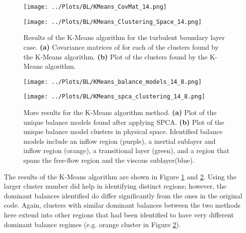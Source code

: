 \documentclass[12pt]{report} %
\begin{document}
\begin{figure}[htbp]
  \centering
  \begin{minipage}{0.9\textwidth}
    \centering
    \texttt{[image: ../Plots/BL/KMeans\_CovMat\_14.png]}
    \subcaption{}
  \end{minipage}

  \begin{minipage}{0.8\textwidth}
    \centering
    \texttt{[image: ../Plots/BL/KMeans\_Clustering\_Space\_14.png]}
    \subcaption{}
  \end{minipage}

  \caption{Results of the K-Means algorithm for the turbulent boundary layer case. \textbf{(a)} Covariance matrices of for each of the clusters found by the K-Means algorithm. \textbf{(b)} Plot of the clusters found by the K-Means algorithm.}
  \label{fig:KMeans_results_1}
\end{figure}

\begin{figure}[htbp]
  \centering
  \begin{minipage}[b]{0.6\textwidth}
      \centering
      \texttt{[image: ../Plots/BL/KMeans\_balance\_models\_14\_8.png]}
      \subcaption{}
  \end{minipage}

  \begin{minipage}[b]{0.6\textwidth}
      \centering
      \texttt{[image: ../Plots/BL/KMeans\_spca\_clustering\_14\_8.png]}
      \subcaption{}
  \end{minipage}

  \caption{More results for the K-Means algorithm method. \textbf{(a)} Plot of the unique balance models found after applying SPCA. \textbf{(b)} Plot of the unique balance model clusters in physical space. Identified balance models include an inflow region (purple), a inertial sublayer and inflow region (orange), a transitional layer (green), and a region that spans the free-flow region and the viscous sublayer(blue).}
  \label{fig:KMeans_results_2}
\end{figure}

The results of the K-Means algorithm are shown in Figure \ref{fig:KMeans_results_1} and \ref{fig:KMeans_results_2}. Using the larger cluster number did help in identifying distinct regions; however, the dominant balances identified do differ significantly from the ones in the original code. Again, clusters with similar dominant balances between the two methods here extend into other regions that had been identified to have very different dominant balance regimes (e.g. orange cluster in Figure \ref{fig:KMeans_results_2}).
\end{document}
